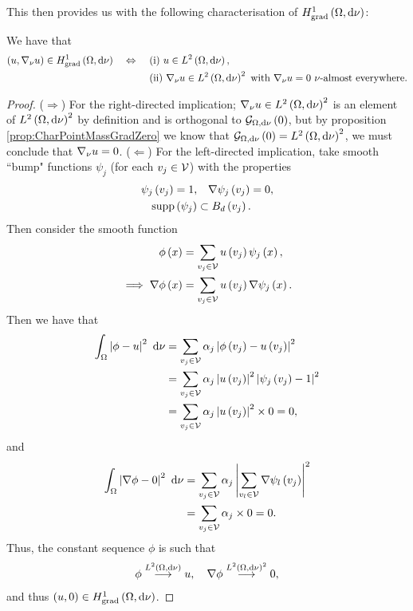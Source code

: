 \documentclass[11pt]{report}
\begin{document}
This then provides us with the following characterisation of $H^1_\mathrm{grad}\left( \Omega, \mathrm{d}\nu \right)$:
\begin{cory} \label{eq:CharPointMassSpace}
	We have that
	\begin{align*}
		\bracs{u,\grad_{\nu}u}\in\gradSob{\ddom}{\nu} \quad\Leftrightarrow\quad 
		& \ \text{(i)} \ u\in\ltwo{\ddom}{\nu}, \\
		& \ \text{(ii)} \ \grad_{\nu}u\in\ltwo{\ddom}{\nu}^2 \ \text{with} \ \grad_{\nu}u = 0 \ \nu\text{-almost everywhere}.
	\end{align*}
\end{cory}
\begin{proof}
	($\Rightarrow$) For the right-directed implication; $\nabla_{\nu}u\in L^{2}\left( \Omega,\mathrm{d}\nu \right)^2$ is an element of $L^{2}\left( \Omega,\mathrm{d}\nu \right)^2$ by definition and is orthogonal to $\mathcal{G}_{ \Omega, \mathrm{d}\nu}\left( 0 \right)$, but by proposition \ref{prop:CharPointMassGradZero} we know that $\mathcal{G}_{ \Omega, \mathrm{d}\nu}\left( 0 \right)=L^{2}\left( \Omega,\mathrm{d}\nu \right)^2$, we must conclude that $\nabla_{\nu}u = 0$. \newline
	($\Leftarrow$) For the left-directed implication, take smooth ``bump" functions $\psi_j$ (for each $v_j\in\mathcal{V}$) with the properties
	\begin{align*}
		\psi_j\left( v_j \right) = 1, &\quad \nabla\psi_j\left( v_j \right) = 0, \\
		\mathrm{supp}\left( \psi_j \right) &\subset B_{d}\left( v_j \right).
	\end{align*}
	Then consider the smooth function
	\begin{align*}
		\phi\left( x \right) &= \sum_{v_j\in\mathcal{V}} u\left( v_j \right)\psi_j\left( x \right), \\
		\implies \nabla\phi\left( x \right) &= \sum_{v_j\in\mathcal{V}} u\left( v_j \right)\nabla\psi_j\left( x \right).
	\end{align*}
	Then we have that
	\begin{align*}
		\int_{\Omega}\left\lvert \phi - u \right\rvert^2 \ \mathrm{d}\nu &= \sum_{v_j\in\mathcal{V}} \alpha_j\left\lvert \phi\left( v_j \right) - u\left( v_j \right) \right\rvert^2 \\
		&= \sum_{v_j\in\mathcal{V}} \alpha_j\left\lvert u\left( v_j \right) \right\rvert^2\left\lvert \psi_j\left( v_j \right)-1 \right\rvert^2 \\
		&= \sum_{v_j\in\mathcal{V}} \alpha_j\left\lvert u\left( v_j \right) \right\rvert^2 \times 0 = 0,
	\end{align*}
	and
	\begin{align*}
		\int_{\Omega}\left\lvert \nabla\phi - 0 \right\rvert^2 \ \mathrm{d}\nu &= \sum_{v_j\in\mathcal{V}} \alpha_j\left\lvert  \sum_{v_l\in\mathcal{V}} \nabla\psi_l\left( v_j \right)  \right\rvert^2 \\
		&= \sum_{v_j\in\mathcal{V}} \alpha_j \times 0 = 0.
	\end{align*}
	Thus, the constant sequence $\phi$ is such that
	\begin{align*}
		\phi \overset{L^{2}\left( \Omega,\mathrm{d}\nu \right)}{\longrightarrow} u, \quad \nabla\phi \overset{L^{2}\left( \Omega,\mathrm{d}\nu \right)^2}{\longrightarrow} 0,
	\end{align*}
	and thus $\left( u,0 \right)\in H^1_\mathrm{grad}\left( \Omega, \mathrm{d}\nu \right)$.
\end{proof}
\end{document}
